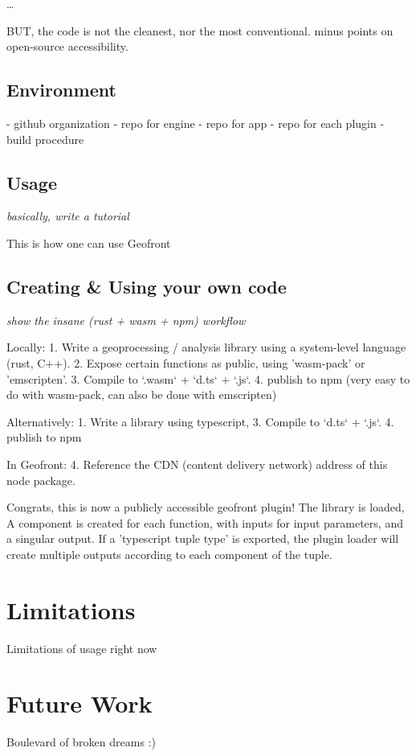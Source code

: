 \dots

BUT, the code is not the cleanest, nor the most conventional. minus points on open-source accessibility.



\subsection{Environment}%
- github organization 
- repo for engine 
- repo for app 
- repo for each plugin
- build procedure

\subsection{Usage}%

\emph{basically, write a tutorial}

This is how one can use Geofront

\subsection{Creating \& Using your own code}
\emph{show the insane (rust + wasm + npm) workflow}

Locally: 
1. Write a geoprocessing / analysis library using a system-level language (rust, C++).
2. Expose certain functions as public, using 'wasm-pack' or 'emscripten'.
3. Compile to `.wasm` + `d.ts` + `.js`.
4. publish to npm (very easy to do with wasm-pack, can also be done with emscripten)

Alternatively: 
1. Write a library using typescript, 
3. Compile to `d.ts` + `.js`.
4. publish to npm 

In Geofront: 
4. Reference the CDN (content delivery network) address of this node package. 

Congrats, this is now a publicly accessible geofront plugin!
The library is loaded, A component is created for each function, with inputs for input parameters, and a singular output. If a 'typescript tuple type' is exported, the plugin loader will create multiple outputs according to each component of the tuple.

\section{Limitations}%

Limitations of usage right now



\section{Future Work}
Boulevard of broken dreams :) 

